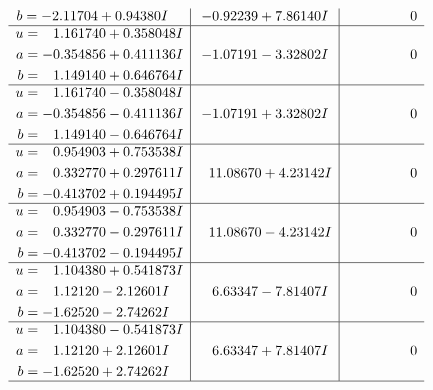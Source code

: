 \documentclass[1p]{elsarticle_modified}
\theoremstyle{definition}
\begin{document}
$$\begin{array}{c|c|c}
\begin{aligned}
b &= -2.11704 + 0.94380 I\end{aligned}
 & -0.92239 + 7.86140 I & \phantom{-0.000000 } 0 \\ \hline\begin{aligned}
u &= \phantom{-}1.161740 + 0.358048 I \\
a &= -0.354856 + 0.411136 I \\
b &= \phantom{-}1.149140 + 0.646764 I\end{aligned}
 & -1.07191 - 3.32802 I & \phantom{-0.000000 } 0 \\ \hline\begin{aligned}
u &= \phantom{-}1.161740 - 0.358048 I \\
a &= -0.354856 - 0.411136 I \\
b &= \phantom{-}1.149140 - 0.646764 I\end{aligned}
 & -1.07191 + 3.32802 I & \phantom{-0.000000 } 0 \\ \hline\begin{aligned}
u &= \phantom{-}0.954903 + 0.753538 I \\
a &= \phantom{-}0.332770 + 0.297611 I \\
b &= -0.413702 + 0.194495 I\end{aligned}
 & \phantom{-}11.08670 + 4.23142 I & \phantom{-0.000000 } 0 \\ \hline\begin{aligned}
u &= \phantom{-}0.954903 - 0.753538 I \\
a &= \phantom{-}0.332770 - 0.297611 I \\
b &= -0.413702 - 0.194495 I\end{aligned}
 & \phantom{-}11.08670 - 4.23142 I & \phantom{-0.000000 } 0 \\ \hline\begin{aligned}
u &= \phantom{-}1.104380 + 0.541873 I \\
a &= \phantom{-}1.12120 - 2.12601 I \\
b &= -1.62520 - 2.74262 I\end{aligned}
 & \phantom{-}6.63347 - 7.81407 I & \phantom{-0.000000 } 0 \\ \hline\begin{aligned}
u &= \phantom{-}1.104380 - 0.541873 I \\
a &= \phantom{-}1.12120 + 2.12601 I \\
b &= -1.62520 + 2.74262 I\end{aligned}
 & \phantom{-}6.63347 + 7.81407 I & \phantom{-0.000000 } 0\\
 \hline 
 \end{array}$$\newpage$$\begin{array}{c|c|c}  

\end{array}$$
\end{document}
